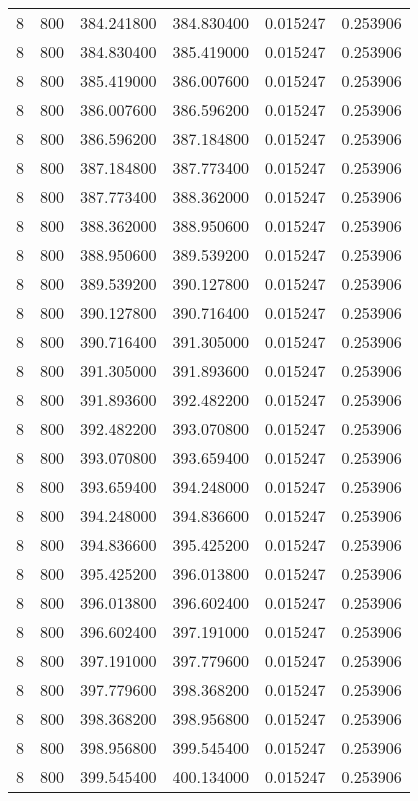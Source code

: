 \begin{longtable}{rrrrrr}
8 & 800 & 384.241800 & 384.830400 & 0.015247 & 0.253906 \\
8 & 800 & 384.830400 & 385.419000 & 0.015247 & 0.253906 \\
8 & 800 & 385.419000 & 386.007600 & 0.015247 & 0.253906 \\
8 & 800 & 386.007600 & 386.596200 & 0.015247 & 0.253906 \\
8 & 800 & 386.596200 & 387.184800 & 0.015247 & 0.253906 \\
8 & 800 & 387.184800 & 387.773400 & 0.015247 & 0.253906 \\
8 & 800 & 387.773400 & 388.362000 & 0.015247 & 0.253906 \\
8 & 800 & 388.362000 & 388.950600 & 0.015247 & 0.253906 \\
8 & 800 & 388.950600 & 389.539200 & 0.015247 & 0.253906 \\
8 & 800 & 389.539200 & 390.127800 & 0.015247 & 0.253906 \\
8 & 800 & 390.127800 & 390.716400 & 0.015247 & 0.253906 \\
8 & 800 & 390.716400 & 391.305000 & 0.015247 & 0.253906 \\
8 & 800 & 391.305000 & 391.893600 & 0.015247 & 0.253906 \\
8 & 800 & 391.893600 & 392.482200 & 0.015247 & 0.253906 \\
8 & 800 & 392.482200 & 393.070800 & 0.015247 & 0.253906 \\
8 & 800 & 393.070800 & 393.659400 & 0.015247 & 0.253906 \\
8 & 800 & 393.659400 & 394.248000 & 0.015247 & 0.253906 \\
8 & 800 & 394.248000 & 394.836600 & 0.015247 & 0.253906 \\
8 & 800 & 394.836600 & 395.425200 & 0.015247 & 0.253906 \\
8 & 800 & 395.425200 & 396.013800 & 0.015247 & 0.253906 \\
8 & 800 & 396.013800 & 396.602400 & 0.015247 & 0.253906 \\
8 & 800 & 396.602400 & 397.191000 & 0.015247 & 0.253906 \\
8 & 800 & 397.191000 & 397.779600 & 0.015247 & 0.253906 \\
8 & 800 & 397.779600 & 398.368200 & 0.015247 & 0.253906 \\
8 & 800 & 398.368200 & 398.956800 & 0.015247 & 0.253906 \\
8 & 800 & 398.956800 & 399.545400 & 0.015247 & 0.253906 \\
8 & 800 & 399.545400 & 400.134000 & 0.015247 & 0.253906 \\

\end{longtable}
